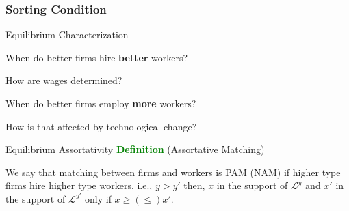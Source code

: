 \documentclass[notes,11pt, aspectratio=169]{beamer}
\newenvironment{wideitemize}{\itemize\addtolength{\itemsep}{10pt}}{\enditemize}
\begin{document}
\subsubsection*{Sorting Condition}
\begin{frame}{Equilibrium Characterization}
	\begin{wideitemize}
		\item  When do better firms hire \textbf{better} workers?
		\item  How are wages determined?
		\item  When do better firms employ \textbf{more} workers?
		\item  How is that affected by technological change?
	\end{wideitemize}
	
\end{frame}

\begin{frame}{Equilibrium Assortativity}
	\textcolor{green}{\textbf{Definition}} (Assortative Matching) 
	\begin{wideitemize}
	\item We say that matching between firms and workers is PAM (NAM) if higher type firms hire higher type workers, i.e., $y>y'$ then, $x$ in the support of $\mathcal{L}^y$ and $x'$ in the support of $\mathcal{L}^{y'}$ only if $x\geq (\leq) x'$.
	\end{wideitemize}
\end{frame}
\end{document}

